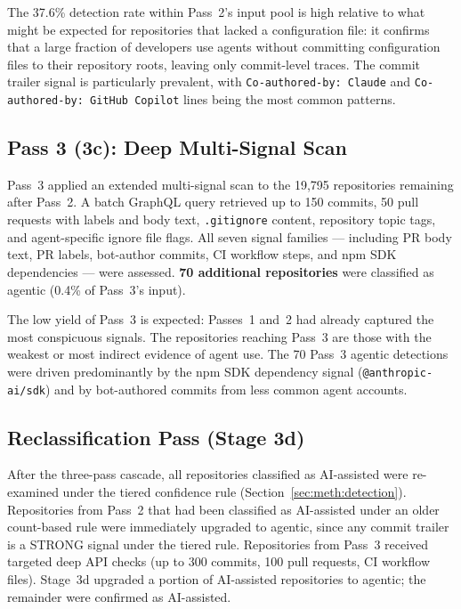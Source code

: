 The 37.6\% detection rate within Pass~2's input pool is high relative to what might be expected for repositories that lacked a configuration file: it confirms that a large fraction of developers use agents without committing configuration files to their repository roots, leaving only commit-level traces. The commit trailer signal is particularly prevalent, with \texttt{Co-authored-by: Claude} and \texttt{Co-authored-by: GitHub Copilot} lines being the most common patterns.

\subsection{Pass 3 (3c): Deep Multi-Signal Scan}

Pass~3 applied an extended multi-signal scan to the 19,795 repositories remaining after Pass~2. A batch GraphQL query retrieved up to 150 commits, 50 pull requests with labels and body text, \texttt{.gitignore} content, repository topic tags, and agent-specific ignore file flags. All seven signal families --- including PR body text, PR labels, bot-author commits, CI workflow steps, and npm SDK dependencies --- were assessed. \textbf{70 additional repositories} were classified as agentic (0.4\% of Pass~3's input).

The low yield of Pass~3 is expected: Passes~1 and~2 had already captured the most conspicuous signals. The repositories reaching Pass~3 are those with the weakest or most indirect evidence of agent use. The 70 Pass~3 agentic detections were driven predominantly by the npm SDK dependency signal (\texttt{@anthropic-ai/sdk}) and by bot-authored commits from less common agent accounts.

\subsection{Reclassification Pass (Stage 3d)}

After the three-pass cascade, all repositories classified as AI-assisted were re-examined under the tiered confidence rule (Section~\ref{sec:meth:detection}). Repositories from Pass~2 that had been classified as AI-assisted under an older count-based rule were immediately upgraded to agentic, since any commit trailer is a STRONG signal under the tiered rule. Repositories from Pass~3 received targeted deep API checks (up to 300 commits, 100 pull requests, CI workflow files). Stage~3d upgraded a portion of AI-assisted repositories to agentic; the remainder were confirmed as AI-assisted.

